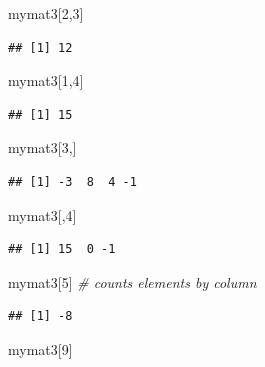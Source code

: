 \documentclass[
]{book}
\newenvironment{Shaded}{\begin{snugshade}}{\end{snugshade}}
\newcommand{\CommentTok}[1]{\textcolor[rgb]{0.56,0.35,0.01}{\textit{#1}}}
\newcommand{\DecValTok}[1]{\textcolor[rgb]{0.00,0.00,0.81}{#1}}
\newcommand{\NormalTok}[1]{#1}
\begin{document}
\begin{Shaded}
\begin{Highlighting}[]
\NormalTok{mymat3[}\DecValTok{2}\NormalTok{,}\DecValTok{3}\NormalTok{]}
\end{Highlighting}
\end{Shaded}

\begin{verbatim}
## [1] 12
\end{verbatim}

\begin{Shaded}
\begin{Highlighting}[]
\NormalTok{mymat3[}\DecValTok{1}\NormalTok{,}\DecValTok{4}\NormalTok{]}
\end{Highlighting}
\end{Shaded}

\begin{verbatim}
## [1] 15
\end{verbatim}

\begin{Shaded}
\begin{Highlighting}[]
\NormalTok{mymat3[}\DecValTok{3}\NormalTok{,]}
\end{Highlighting}
\end{Shaded}

\begin{verbatim}
## [1] -3  8  4 -1
\end{verbatim}

\begin{Shaded}
\begin{Highlighting}[]
\NormalTok{mymat3[,}\DecValTok{4}\NormalTok{]}
\end{Highlighting}
\end{Shaded}

\begin{verbatim}
## [1] 15  0 -1
\end{verbatim}

\begin{Shaded}
\begin{Highlighting}[]
\NormalTok{mymat3[}\DecValTok{5}\NormalTok{] }\CommentTok{\# counts elements by column}
\end{Highlighting}
\end{Shaded}

\begin{verbatim}
## [1] -8
\end{verbatim}

\begin{Shaded}
\begin{Highlighting}[]
\NormalTok{mymat3[}\DecValTok{9}\NormalTok{]}
\end{Highlighting}
\end{Shaded}
\end{document}
